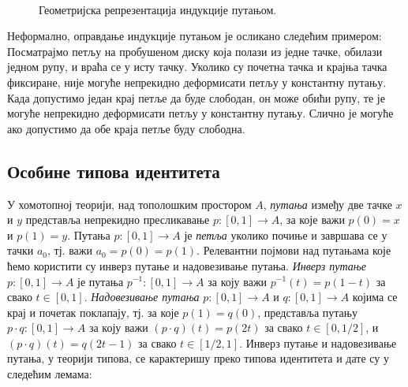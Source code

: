 \documentclass[12pt,oneside]{memoir}
\begin{document}
\begin{figure}[!ht]
    \centering\
    \label{fig:path_ind}
    \caption{Геометријска репрезентација индукције путањом.}
\end{figure}

Неформално, оправдање индукције путањом је осликано следећим примером: Посматрајмо петљу на пробушеном диску која полази из једне тачке, обилази једном рупу, и враћа се у исту тачку. Уколико су почетна тачка и крајња тачка фиксиране, није могуће непрекидно деформисати петљу у константну путању. Када допустимо један крај петље да буде слободан, он може обићи рупу, те је могуће непрекидно деформисати петљу у константну путању. Слично је могуће ако допустимо да обе краја петље буду слободна. 

\subsection{Особине типова идентитета}

У хомотопној теорији, над тополошким простором $A$, \emph{путања} између две тачке $x$ и $y$ представља непрекидно пресликавање $p : [0, 1] \to A$, за које важи $p(0) = x$ и $p(1) = y$. Путања $p : [0, 1] \to A$ је \emph{петља} уколико почиње и завршава се у тачки $a_0$, тј. важи $a_0 = p(0) = p(1)$. Релевантни појмови над путањама које ћемо користити су инверз путање и надовезивање путања. \emph{Инверз путање} $p : [0, 1] \to A$ је путања $p^{-1} : [0, 1] \to A$ за коју важи $p^{-1} (t) = p (1 - t)$ за свако $t \in [0, 1]$. \emph{Надовезивање путања} $p : [0, 1] \to A$ и $q : [0, 1] \to A$ којима се крај и почетак поклапају, тј. за које $p(1) = q(0)$, представља путању $p \cdot q : [0, 1] \to A$ за коју важи $(p \cdot q) (t) = p(2t)$ за свако $t \in [0, 1/2]$, и $(p \cdot q) (t) = q(2t - 1)$ за свако $t \in [1/2, 1]$. Инверз путање и надовезивање путања, у теорији типова, се карактеришу преко типова идентитета и дате су у следећим лемама:
\end{document}
